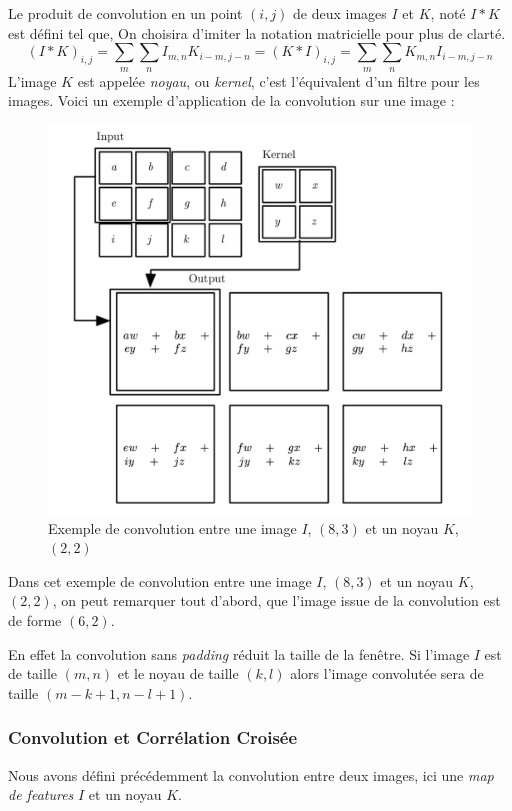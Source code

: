 \documentclass[a4paper, 11pt]{report}
\begin{document}
Le produit de convolution en un point $(i,j)$ de deux images $I$ et $K$, noté $I * K$ est défini tel que,
On choisira d'imiter la notation matricielle pour plus de clarté.
$$(I*K)_{i,j} = \sum_{m}\sum_{n}{I_{m,n}K_{i-m,j-n}} = (K*I)_{i,j} = \sum_{m}\sum_{n}{K_{m,n}I_{i-m,j-n}}$$
L'image $K$ est appelée \emph{noyau}, ou \emph{kernel}, c'est l'équivalent d'un filtre pour les images.
Voici un exemple d'application de la convolution sur une image :
\begin{figure}[H]
	\begin{center}
		\includegraphics[scale=0.25]{Images/Convolution.png}
		\caption{Exemple de convolution entre une image $I$, $(8,3)$ et un noyau $K$, $(2,2)$}
	\end{center}
\end{figure}
Dans cet exemple de convolution entre une image $I$, $(8,3)$ et un noyau $K$, $(2,2)$, on peut remarquer tout d'abord, que l'image issue de la convolution est de forme $(6,2)$.

En effet la convolution sans \emph{padding} réduit la taille de la fenêtre.
Si l'image $I$ est de taille $(m,n)$ et le noyau de taille $(k,l)$ alors l'image convolutée sera de taille $(m-k+1,n-l+1)$.
\subsubsection{Convolution et Corrélation Croisée}
Nous avons défini précédemment la convolution entre deux images, ici une \emph{map de features} $I$ et un noyau $K$.
\end{document}
